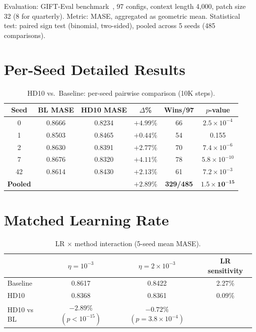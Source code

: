 \documentclass[letterpaper]{article}
\begin{document}
Evaluation: GIFT-Eval benchmark~\citep{vijay2024gifteval}, 97 configs, context length 4,000, patch size 32 (8 for quarterly). Metric: MASE, aggregated as geometric mean. Statistical test: paired sign test (binomial, two-sided), pooled across 5 seeds (485 comparisons).

\section{Per-Seed Detailed Results}
\label{app:seeds}

\begin{table}[h]
\centering
\caption{HD10 vs.\ Baseline: per-seed pairwise comparison (10K steps).}
\small
\begin{tabular}{cccccc}
\toprule
\textbf{Seed} & \textbf{BL MASE} & \textbf{HD10 MASE} & \textbf{$\Delta$\%} & \textbf{Wins/97} & \textbf{$p$-value} \\
\midrule
0 & 0.8666 & 0.8234 & $+4.99\%$ & 66 & $2.5 \times 10^{-4}$ \\
1 & 0.8503 & 0.8465 & $+0.44\%$ & 54 & 0.155 \\
2 & 0.8630 & 0.8391 & $+2.77\%$ & 70 & $7.4 \times 10^{-6}$ \\
7 & 0.8676 & 0.8320 & $+4.11\%$ & 78 & $5.8 \times 10^{-10}$ \\
42 & 0.8614 & 0.8430 & $+2.13\%$ & 61 & $7.2 \times 10^{-3}$ \\
\midrule
\textbf{Pooled} & & & \textbf{$+2.89\%$} & \textbf{329/485} & $\mathbf{1.5 \times 10^{-15}}$ \\
\bottomrule
\end{tabular}
\end{table}

\section{Matched Learning Rate}
\label{app:lr}

\begin{table}[h]
\centering
\caption{LR $\times$ method interaction (5-seed mean MASE).}
\small
\begin{tabular}{lccc}
\toprule
& $\eta = 10^{-3}$ & $\eta = 2 \times 10^{-3}$ & LR sensitivity \\
\midrule
Baseline & 0.8617 & 0.8422 & 2.27\% \\
HD10 & 0.8368 & 0.8361 & 0.09\% \\
\midrule
HD10 vs BL & $-2.89\%$ $(p < 10^{-15})$ & $-0.72\%$ $(p = 3.8 \times 10^{-4})$ & \\
\bottomrule
\end{tabular}
\end{table}
\end{document}
